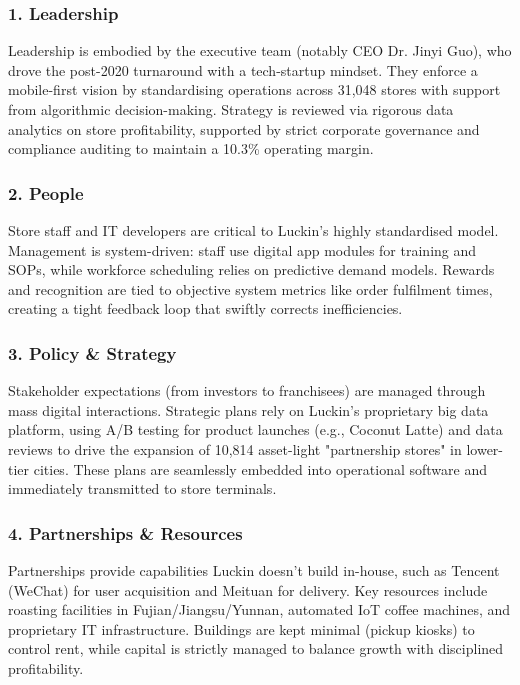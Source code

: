 \documentclass[12pt,a4paper]{article}
\begin{document}
\subsubsection*{1. Leadership}
Leadership is embodied by the executive team (notably CEO Dr. Jinyi Guo), who drove the post-2020 turnaround with a tech-startup mindset. They enforce a mobile-first vision by standardising operations across 31,048 stores with support from algorithmic decision-making. Strategy is reviewed via rigorous data analytics on store profitability, supported by strict corporate governance and compliance auditing to maintain a 10.3\% operating margin.

\subsubsection*{2. People}
Store staff and IT developers are critical to Luckin's highly standardised model. Management is system-driven: staff use digital app modules for training and SOPs, while workforce scheduling relies on predictive demand models. Rewards and recognition are tied to objective system metrics like order fulfilment times, creating a tight feedback loop that swiftly corrects inefficiencies.

\subsubsection*{3. Policy \& Strategy}
Stakeholder expectations (from investors to franchisees) are managed through mass digital interactions. Strategic plans rely on Luckin's proprietary big data platform, using A/B testing for product launches (e.g., Coconut Latte) and data reviews to drive the expansion of 10,814 asset-light "partnership stores" in lower-tier cities. These plans are seamlessly embedded into operational software and immediately transmitted to store terminals.

\subsubsection*{4. Partnerships \& Resources}
Partnerships provide capabilities Luckin doesn't build in-house, such as Tencent (WeChat) for user acquisition and Meituan for delivery. Key resources include roasting facilities in Fujian/Jiangsu/Yunnan, automated IoT coffee machines, and proprietary IT infrastructure. Buildings are kept minimal (pickup kiosks) to control rent, while capital is strictly managed to balance growth with disciplined profitability.
\end{document}
